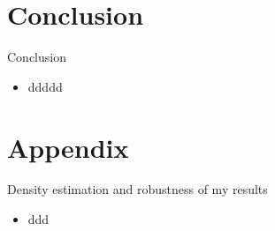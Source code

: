 \documentclass{beamer}
\begin{document}


\section{Conclusion}

\begin{frame}{Conclusion}
	\begin{itemize}
		\item ddddd
	\end{itemize}	
\end{frame}

\section*{Appendix}

\begin{frame}{Density estimation and robustness of my results}
	\begin{itemize}
		\item ddd
	\end{itemize}
\end{frame}




\end{document}
